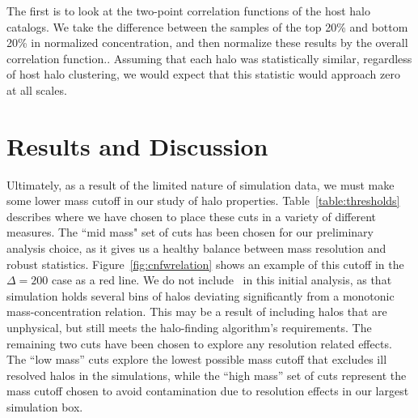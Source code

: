 \documentclass[usenatbib,usegraphicx,letterpaper]{mn2e}
\begin{document}
The first is to look at the two-point correlation functions of the host halo catalogs. We take the difference between the samples of the top 20\% and bottom 20\% in normalized concentration, and then normalize these results by the overall correlation function.. Assuming that each halo was statistically similar, regardless of host halo clustering, we would expect that this statistic would approach zero at all scales.



\section[]{Results and Discussion}
\label{section:results}

Ultimately, as a result of the limited nature of simulation data, we must make some lower mass cutoff in our study of halo properties. Table~\ref{table:thresholds} describes where we have chosen to place these cuts in a variety of different measures. The ``mid mass" set of cuts has been chosen for our preliminary analysis choice, as it gives us a healthy balance between mass resolution and robust statistics. Figure~\ref{fig:cnfwrelation} shows an example of this cutoff in the $\Delta = 200$ case as a red line. We do not include \simC \ in this initial analysis, as that simulation holds several bins of halos deviating significantly from a monotonic mass-concentration relation. This may be a result of including halos that are unphysical, but still meets the halo-finding algorithm's requirements.  The remaining two cuts have been chosen to explore any resolution related effects. The ``low mass'' cuts explore the lowest possible mass cutoff that excludes ill resolved halos in the \citet{diemer15} simulations, while the ``high mass'' set of cuts represent the mass cutoff chosen to avoid contamination due to resolution effects in our largest simulation box.
\end{document}
